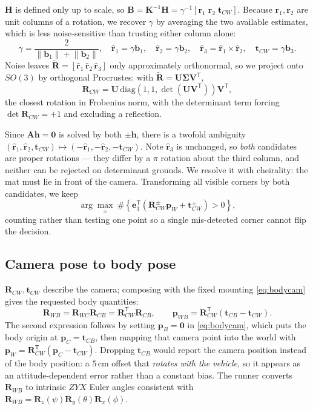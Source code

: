 \documentclass[10pt]{article}
\newcommand{\R}{\mathbf{R}}
\newcommand{\vt}[1]{\mathbf{#1}}
\newcommand{\Rwb}{\R_{WB}}
\newcommand{\Rcw}{\R_{CW}}
\newcommand{\Rwc}{\R_{WC}}
\newcommand{\Rcb}{\R_{CB}}
\newcommand{\norm}[1]{\left\lVert#1\right\rVert}
\begin{document}
$\mathbf{H}$ is defined only up to scale, so $\mathbf{B} = \mathbf{K}^{-1}\mathbf{H} =
\gamma^{-1}[\vt{r}_1\;\vt{r}_2\;\vt{t}_{CW}]$. Because $\vt{r}_1,\vt{r}_2$ are unit columns of a
rotation, we recover $\gamma$ by averaging the two available estimates, which is less noise-sensitive
than trusting either column alone:
\begin{equation}
\gamma = \frac{2}{\norm{\vt{b}_1}+\norm{\vt{b}_2}},\quad
\hat{\vt{r}}_1 = \gamma\vt{b}_1,\quad \hat{\vt{r}}_2 = \gamma\vt{b}_2,\quad
\hat{\vt{r}}_3 = \hat{\vt{r}}_1\times\hat{\vt{r}}_2,\quad
\vt{t}_{CW} = \gamma\vt{b}_3 .
\end{equation}
Noise leaves $\widetilde{\R}=[\hat{\vt{r}}_1\,\hat{\vt{r}}_2\,\hat{\vt{r}}_3]$ only approximately
orthonormal, so we project onto $SO(3)$ by orthogonal Procrustes: with $\widetilde{\R} =
\mathbf{U}\bm{\Sigma}\mathbf{V}^{\mathsf T}$,
\begin{equation}
\Rcw = \mathbf{U}\,\mathrm{diag}\!\left(1,1,\det(\mathbf{U}\mathbf{V}^{\mathsf T})\right)\mathbf{V}^{\mathsf T},
\end{equation}
the closest rotation in Frobenius norm, with the determinant term forcing $\det\Rcw=+1$ and
excluding a reflection.

Since $\mathbf{A}\vt{h}=\vt{0}$ is solved by both $\pm\vt{h}$, there is a twofold ambiguity
$(\hat{\vt{r}}_1,\hat{\vt{r}}_2,\vt{t}_{CW})\mapsto(-\hat{\vt{r}}_1,-\hat{\vt{r}}_2,-\vt{t}_{CW})$.
Note $\hat{\vt{r}}_3$ is unchanged, so \emph{both} candidates are proper rotations --- they differ by
a $\pi$ rotation about the third column, and neither can be rejected on determinant grounds. We
resolve it with cheirality: the mat must lie in front of the camera. Transforming all visible
corners by both candidates, we keep
\begin{equation}
\arg\max_{\pm}\ \#\left\{\vt{e}_3^{\mathsf T}\!\left(\Rcw^{\pm}\vt{p}_W+\vt{t}_{CW}^{\pm}\right)>0\right\},
\end{equation}
counting rather than testing one point so a single mis-detected corner cannot flip the decision.

\subsection{Camera pose to body pose}

$\Rcw,\vt{t}_{CW}$ describe the camera; composing with the fixed mounting \eqref{eq:bodycam} gives
the requested body quantities:
\begin{equation}
\Rwb = \Rwc\Rcb = \Rcw^{\mathsf T}\Rcb,
\qquad
\vt{p}_{WB} = \Rcw^{\mathsf T}\!\left(\vt{t}_{CB}-\vt{t}_{CW}\right).
\end{equation}
The second expression follows by setting $\vt{p}_B=\vt{0}$ in \eqref{eq:bodycam}, which puts the body
origin at $\vt{p}_C=\vt{t}_{CB}$, then mapping that camera point into the world with $\vt{p}_W =
\Rcw^{\mathsf T}(\vt{p}_C-\vt{t}_{CW})$. Dropping $\vt{t}_{CB}$ would report the camera position
instead of the body position: a $5\,$cm offset that \emph{rotates with the vehicle}, so it appears as
an attitude-dependent error rather than a constant bias. The runner converts $\Rwb$ to intrinsic
$ZYX$ Euler angles consistent with $\Rwb = \R_z(\psi)\R_y(\theta)\R_x(\phi)$.
\end{document}
